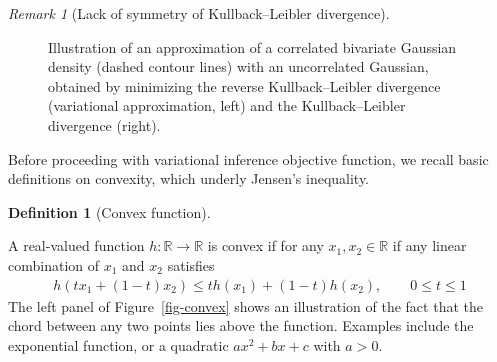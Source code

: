 \documentclass[
  11pt,
  letterpaper,
]{scrbook}
\theoremstyle{plain}
\theoremstyle{plain}
\theoremstyle{plain}
\theoremstyle{definition}
\theoremstyle{definition}
\theoremstyle{definition}
\newtheorem{definition}{Definition}[chapter]
\theoremstyle{remark}
\newtheorem{refremark}{Remark}[chapter]
\begin{document}
\begin{refremark}[Lack of symmetry of Kullback--Leibler divergence]
\begin{figure}[ht!]
{}

\caption{\label{fig-klvsrev}Illustration of an approximation of a
correlated bivariate Gaussian density (dashed contour lines) with an
uncorrelated Gaussian, obtained by minimizing the reverse
Kullback--Leibler divergence (variational approximation, left) and the
Kullback--Leibler divergence (right).}

\end{figure}%

\label{rem-symmetry-kld}

\end{refremark}

Before proceeding with variational inference objective function, we
recall basic definitions on convexity, which underly Jensen's
inequality.

\begin{definition}[Convex
function]\protect\hypertarget{def-convex-function}{}\label{def-convex-function}

A real-valued function \(h: \mathbb{R} \to \mathbb{R}\) is convex if for
any \(x_1,x_2 \in \mathbb{R}\) if any linear combination of \(x_1\) and
\(x_2\) satisfies \begin{align*}
h(tx_1 + (1-t)x_2) \leq t h(x_1) + (1-t) h(x_2), \qquad 0 \leq t \leq 1
\end{align*} The left panel of Figure~\ref{fig-convex} shows an
illustration of the fact that the chord between any two points lies
above the function. Examples include the exponential function, or a
quadratic \(ax^2+bx + c\) with \(a>0.\)

\end{definition}
\end{document}
